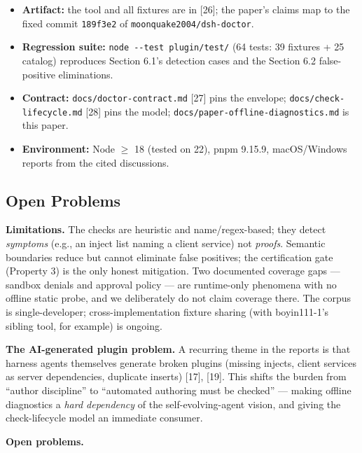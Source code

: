 \documentclass[11pt]{article}
\providecommand{\tightlist}{%
  \setlength{\itemsep}{0pt}\setlength{\parskip}{0pt}}
\begin{document}
\begin{itemize}
\tightlist
\item
  \textbf{Artifact:} the tool and all fixtures are in [26]; the
  paper's claims map to the fixed commit \texttt{189f3e2} of
  \texttt{moonquake2004/dsh-doctor}.
\item
  \textbf{Regression suite:} \texttt{node\ -\/-test\ plugin/test/} (64
  tests: 39 fixtures + 25 catalog) reproduces Section 6.1's detection
  cases and the Section 6.2 false-positive eliminations.
\item
  \textbf{Contract:} \texttt{docs/doctor-contract.md} [27] pins the
  envelope; \texttt{docs/check-lifecycle.md} [28] pins the model;
  \texttt{docs/paper-offline-diagnostics.md} is this paper.
\item
  \textbf{Environment:} Node  $\geq$ 18 (tested on 22), pnpm 9.15.9,
  macOS/Windows reports from the cited discussions.
\end{itemize}

\subsection{Open Problems}\label{open-problems}

\textbf{Limitations.} The checks are heuristic and name/regex-based;
they detect \emph{symptoms} (e.g., an inject list naming a client
service) not \emph{proofs}. Semantic boundaries reduce but cannot
eliminate false positives; the certification gate (Property 3) is the
only honest mitigation. Two documented coverage gaps --- sandbox denials
and approval policy --- are runtime-only phenomena with no offline
static probe, and we deliberately do not claim coverage there. The
corpus is single-developer; cross-implementation fixture sharing (with
boyin111-1's sibling tool, for example) is ongoing.

\textbf{The AI-generated plugin problem.} A recurring theme in the
reports is that harness agents themselves generate broken plugins
(missing injects, client services as server dependencies, duplicate
inserts) [17], [19]. This shifts the burden from ``author
discipline'' to ``automated authoring must be checked'' --- making
offline diagnostics a \emph{hard dependency} of the self-evolving-agent
vision, and giving the check-lifecycle model an immediate consumer.

\textbf{Open problems.}
\end{document}
